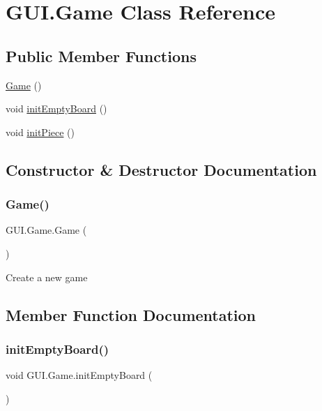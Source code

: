 \hypertarget{class_g_u_i_1_1_game}{}\section{G\+U\+I.\+Game Class Reference}
\label{class_g_u_i_1_1_game}
\subsection*{Public Member Functions}
\begin{DoxyCompactItemize}
\item 
\mbox{\hyperlink{class_g_u_i_1_1_game_a97c23a5cb3fed78d68ef75d6d889b77a}{Game}} ()
\item 
void \mbox{\hyperlink{class_g_u_i_1_1_game_a06bbabe1198734cbc19e45458f44bc9e}{init\+Empty\+Board}} ()
\item 
void \mbox{\hyperlink{class_g_u_i_1_1_game_aef9ef14fe6c177e97b41280180c7ae2d}{init\+Piece}} ()
\end{DoxyCompactItemize}


\subsection{Constructor \& Destructor Documentation}
\mbox{\label{class_g_u_i_1_1_game_a97c23a5cb3fed78d68ef75d6d889b77a}} 
\subsubsection{\texorpdfstring{Game()}{Game()}}
{\footnotesize\ttfamily G\+U\+I.\+Game.\+Game (\begin{DoxyParamCaption}{ }\end{DoxyParamCaption})\hspace{0.3cm}{\ttfamily [inline]}}

Create a new game 

\subsection{Member Function Documentation}
\mbox{\label{class_g_u_i_1_1_game_a06bbabe1198734cbc19e45458f44bc9e}} 
\subsubsection{\texorpdfstring{initEmptyBoard()}{initEmptyBoard()}}
{\footnotesize\ttfamily void G\+U\+I.\+Game.\+init\+Empty\+Board (\begin{DoxyParamCaption}{ }\end{DoxyParamCaption})\hspace{0.3cm}{\ttfamily [inline]}}

